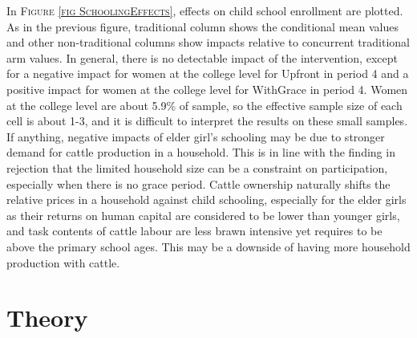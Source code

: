 	In \textsc{\footnotesize Figure \ref{fig SchoolingEffects}}, effects on child school enrollment are plotted. As in the previous figure, \textsf{traditional} column shows the conditional mean values and other non-\textsf{traditional} columns show impacts relative to concurrent \textsf{traditional} arm values. In general, there is no detectable impact of the intervention, except for a negative impact for women at the college level for \textsf{Upfront} in period 4 and a positive impact for women at the college level for \textsf{WithGrace} in period 4. Women at the college level are about 5.9\% of sample, so the effective sample size of each cell is about 1-3, and it is difficult to interpret the results on these small samples. If anything, negative impacts of elder girl's schooling may be due to stronger demand for cattle production in a household. This is in line with the finding in rejection that the limited household size can be a constraint on participation, especially when there is no grace period. Cattle ownership naturally shifts the relative prices in a household against child schooling, especially for the elder girls as their returns on human capital are considered to be lower than younger girls, and task contents of cattle labour are less brawn intensive yet requires to be above the primary school ages. This may be a downside of having more household production with cattle.



\section{Theory}
\label{SecTheory}


